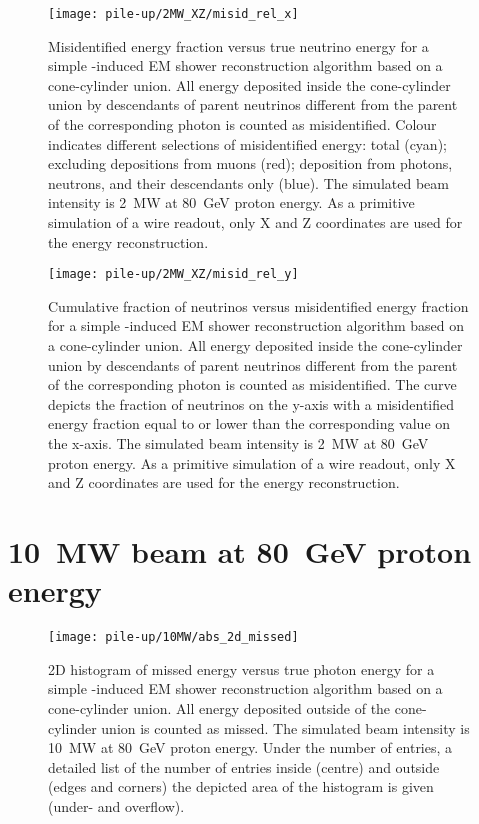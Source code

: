 \begin{figure}[htb]
	\centering
	\texttt{[image: pile-up/2MW\_XZ/misid\_rel\_x]}
	\caption{Misidentified energy fraction versus true neutrino energy for a simple \Pgpz-induced EM shower reconstruction algorithm based on a cone-cylinder union.
		All energy deposited inside the cone-cylinder union by descendants of parent neutrinos different from the parent of the corresponding \Pgpz photon is counted as misidentified.
		Colour indicates different selections of misidentified energy: total (cyan); excluding depositions from muons (red); deposition from photons, neutrons, and their descendants only (blue).
		The simulated beam intensity is \SI{2}{\mega\watt} at \SI{80}{\giga\electronvolt} proton energy.
		As a primitive simulation of a wire readout, only X and Z coordinates are used for the energy reconstruction.}
\end{figure}

\begin{figure}[htb]
	\centering
	\texttt{[image: pile-up/2MW\_XZ/misid\_rel\_y]}
	\caption{Cumulative fraction of neutrinos versus misidentified energy fraction for a simple \Pgpz-induced EM shower reconstruction algorithm based on a cone-cylinder union.
		All energy deposited inside the cone-cylinder union by descendants of parent neutrinos different from the parent of the corresponding \Pgpz photon is counted as misidentified.
		The curve depicts the fraction of neutrinos on the y-axis with a misidentified energy fraction equal to or lower than the corresponding value on the x-axis.
		The simulated beam intensity is \SI{2}{\mega\watt} at \SI{80}{\giga\electronvolt} proton energy.
		As a primitive simulation of a wire readout, only X and Z coordinates are used for the energy reconstruction.}
\end{figure}

\clearpage

\section{\SI{10}{\mega\watt} beam at \SI{80}{\giga\electronvolt} proton energy}

\begin{figure}[htb]
	\centering
	\texttt{[image: pile-up/10MW/abs\_2d\_missed]}
	\caption{2D histogram of missed energy versus true photon energy for a simple \Pgpz-induced EM shower reconstruction algorithm based on a cone-cylinder union.
		All energy deposited outside of the cone-cylinder union is counted as missed.
		The simulated beam intensity is \SI{10}{\mega\watt} at \SI{80}{\giga\electronvolt} proton energy.
		Under the number of entries, a detailed list of the number of entries inside (centre) and outside (edges and corners) the depicted area of the histogram is given (under- and overflow).}
\end{figure}

